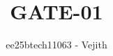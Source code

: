 \documentclass[journal]{IEEEtran}
\begin{document}

\vspace{3cm}


\title{GATE-01}
\author{ee25btech11063 - Vejith}
\maketitle
{\let\newpage\relax\maketitle}

\renewcommand{\thefigure}{\theenumi}
\renewcommand{\thetable}{\theenumi}
\setlength{\intextsep}{10pt} %
\end{document}
